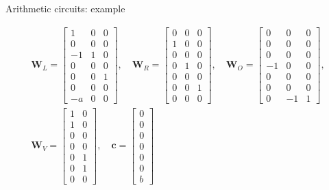 \documentclass{zkdl-presentation-template}
\begin{document}
    \begin{frame}{Arithmetic circuits: example}
        \begin{example}
        \begin{align*}
        \mathbf{W}_L = \begin{bmatrix}
            1 & 0 & 0 \\
            0 & 0 & 0 \\
            -1 & 1 & 0 \\
            0 & 0 & 0 \\
            0 & 0 & 1 \\
            0 & 0 & 0 \\
            -a & 0 & 0
        \end{bmatrix},\quad
        \mathbf{W}_R = \begin{bmatrix}
            0 & 0 & 0 \\
            1 & 0 & 0 \\
            0 & 0 & 0 \\
            0 & 1 & 0 \\
            0 & 0 & 0 \\
            0 & 0 & 1 \\
            0 & 0 & 0
        \end{bmatrix},\quad
        \mathbf{W}_O = \begin{bmatrix}
            0 & 0 & 0 \\
            0 & 0 & 0 \\
            0 & 0 & 0 \\
            -1 & 0 & 0 \\
            0 & 0 & 0 \\
            0 & 0 & 0 \\
            0 & -1 & 1
        \end{bmatrix},\\
        \mathbf{W}_V = \begin{bmatrix}
            1 & 0 \\
            1 & 0 \\
            0 & 0 \\
            0 & 0 \\
            0 & 1 \\
            0 & 1 \\
            0 & 0
        \end{bmatrix},\quad
        \mathbf{c} = \begin{bmatrix}
            0 \\ 0 \\ 0 \\ 0 \\ 0 \\ 0 \\ b
        \end{bmatrix}
        \end{align*}
        \end{example}
    \end{frame}
\end{document}
